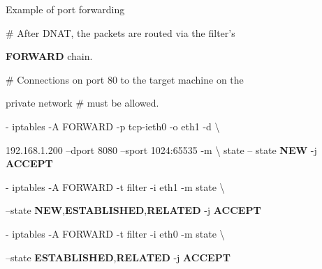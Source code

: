 \begin{frame}[t,allowframebreaks]{Example of port forwarding}
  \fontsize{15}{18}\selectfont
  \vspace{0.08cm}
  {\color{CommandGreen}\ttfamily\fontsize{13.5}{16.5}\selectfont \# After DNAT, the packets are routed via the filter's\par}
  \textcolor{WarningColor}{\bfseries FORWARD} chain.\par
  \vspace{0.08cm}
  {\color{CommandGreen}\ttfamily\fontsize{13.5}{16.5}\selectfont \# Connections on port 80 to the target machine on the\par}
  private network \# must be allowed.\par
  \vspace{0.08cm}
  {\color{CommandGreen}\ttfamily\fontsize{13.5}{16.5}\selectfont - iptables -A FORWARD -p tcp-ieth0 -o eth1 -d \textbackslash{}\par}
  192.168.1.200 --dport 8080 --sport 1024:65535 -m \textbackslash{} state -- state \textcolor{WarningColor}{\bfseries NEW} -j \textcolor{WarningColor}{\bfseries ACCEPT}\par
  \vspace{0.08cm}
  {\color{CommandGreen}\ttfamily\fontsize{13.5}{16.5}\selectfont - iptables -A FORWARD -t filter -i eth1 -m state \textbackslash{}\par}
  --state \textcolor{WarningColor}{\bfseries NEW},\textcolor{WarningColor}{\bfseries ESTABLISHED},\textcolor{WarningColor}{\bfseries RELATED} -j \textcolor{WarningColor}{\bfseries ACCEPT}\par
  \vspace{0.08cm}
  {\color{CommandGreen}\ttfamily\fontsize{13.5}{16.5}\selectfont - iptables -A FORWARD -t filter -i eth0 -m state \textbackslash{}\par}
  --state \textcolor{WarningColor}{\bfseries ESTABLISHED},\textcolor{WarningColor}{\bfseries RELATED} -j \textcolor{WarningColor}{\bfseries ACCEPT}\par
\end{frame}
